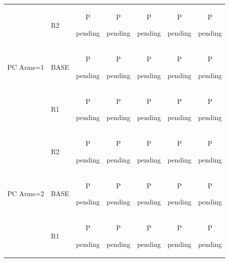 \begin{tabular}{@{}llccccc@{}}
 & R2 & \shortstack[c]{\strut P\\[-3pt]\strut pending} & \shortstack[c]{\strut P\\[-3pt]\strut pending} & \shortstack[c]{\strut P\\[-3pt]\strut pending} & \shortstack[c]{\strut P\\[-3pt]\strut pending} & \shortstack[c]{\strut P\\[-3pt]\strut pending}\\
\addlinespace[2pt]
PC Arms=1 & BASE & \shortstack[c]{\strut P\\[-3pt]\strut pending} & \shortstack[c]{\strut P\\[-3pt]\strut pending} & \shortstack[c]{\strut P\\[-3pt]\strut pending} & \shortstack[c]{\strut P\\[-3pt]\strut pending} & \shortstack[c]{\strut P\\[-3pt]\strut pending}\\
 & R1 & \shortstack[c]{\strut P\\[-3pt]\strut pending} & \shortstack[c]{\strut P\\[-3pt]\strut pending} & \shortstack[c]{\strut P\\[-3pt]\strut pending} & \shortstack[c]{\strut P\\[-3pt]\strut pending} & \shortstack[c]{\strut P\\[-3pt]\strut pending}\\
 & R2 & \shortstack[c]{\strut P\\[-3pt]\strut pending} & \shortstack[c]{\strut P\\[-3pt]\strut pending} & \shortstack[c]{\strut P\\[-3pt]\strut pending} & \shortstack[c]{\strut P\\[-3pt]\strut pending} & \shortstack[c]{\strut P\\[-3pt]\strut pending}\\
\addlinespace[2pt]
PC Arms=2 & BASE & \shortstack[c]{\strut P\\[-3pt]\strut pending} & \shortstack[c]{\strut P\\[-3pt]\strut pending} & \shortstack[c]{\strut P\\[-3pt]\strut pending} & \shortstack[c]{\strut P\\[-3pt]\strut pending} & \shortstack[c]{\strut P\\[-3pt]\strut pending}\\
 & R1 & \shortstack[c]{\strut P\\[-3pt]\strut pending} & \shortstack[c]{\strut P\\[-3pt]\strut pending} & \shortstack[c]{\strut P\\[-3pt]\strut pending} & \shortstack[c]{\strut P\\[-3pt]\strut pending} & \shortstack[c]{\strut P\\[-3pt]\strut pending}\\

\end{tabular}
